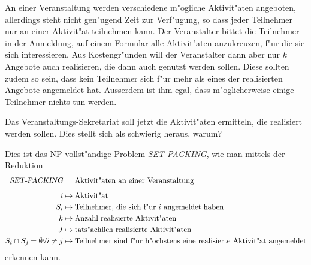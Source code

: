 An einer Veranstaltung werden verschiedene m"ogliche Aktivit"aten angeboten,
allerdings steht nicht gen"ugend Zeit zur Verf"ugung, so dass jeder
Teilnehmer nur an einer Aktivit"at teilnehmen kann.
Der Veranstalter bittet die Teilnehmer in der Anmeldung, auf einem
Formular alle Aktivit"aten anzukreuzen, f"ur die sie sich interessieren.
Aus Kostengr"unden will der Veranstalter dann aber nur $k$ Angebote
auch realisieren, die dann auch genutzt werden sollen.
Diese sollten zudem so sein, dass kein Teilnehmer sich f"ur mehr als
eines der realisierten Angebote angemeldet hat.
Ausserdem ist ihm egal, dass m"oglicherweise einige Teilnehmer nichts tun
werden.

Das Veranstaltungs-Sekretariat soll jetzt die Aktivit"aten ermitteln, 
die realisiert werden sollen.
Dies stellt sich als schwierig heraus, warum?

\begin{loesung}
Dies ist das NP-vollst"andige Problem \textsl{SET-PACKING}, wie man 
mittels der Reduktion
\begin{align*}
\textsl{SET-PACKING}&\phantom{\mathstrut\mapsto\mathstrut}\textrm{Aktivit"aten an einer Veranstaltung}
\\[5pt]
i&\mapsto \textrm{Aktivit"at}
\\
S_i&\mapsto \textrm{Teilnehmer, die sich f"ur $i$ angemeldet haben}
\\
k&\mapsto \textrm{Anzahl realisierte Aktivit"aten}
\\
J&\mapsto \textrm{tats"achlich realisierte Aktivit"aten}
\\
S_i\cap S_j=\emptyset\forall i\ne j
&\mapsto \textrm{Teilnehmer sind f"ur h"ochstens eine realisierte Aktivit"at angemeldet}
\end{align*}
erkennen kann.
\end{loesung}

\begin{bewertung}
\end{bewertung}

